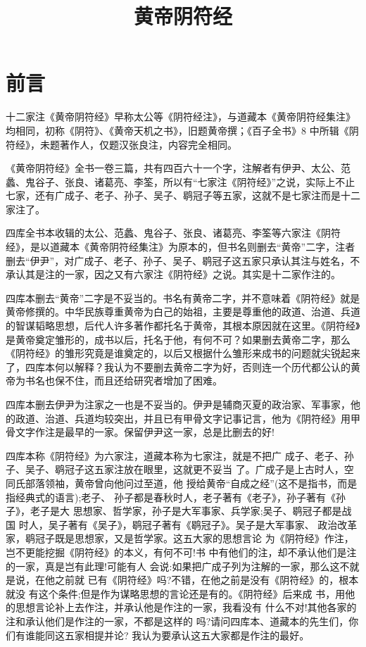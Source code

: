 \documentclass[12pt,UTF8]{ctexbook}
\title{\heiti\zihao{0} 黄帝阴符经}
\author{}
\date{}
\begin{document}
\maketitle
\tableofcontents

\frontmatter
\chapter{前言}

十二家注《黄帝阴符经》早称太公等《阴符经注》，与道藏本《黄帝阴符经集注》均相同，初称《阴符》、《黄帝天机之书》，旧题黄帝撰；《百子全书》8 中所辑《阴符经》，未题著作人，仅题汉张良注，内容完全相同。

《黄帝阴符经》全书一卷三篇，共有四百六十一个字，注解者有伊尹、太公、范蠡、鬼谷子、张良、诸葛亮、李筌，所以有“七家注《阴符经》”之说，实际上不止七家，还有广成子、老子、孙子、吴子、鹖冠子等五家，这就不是七家注而是十二家注了。

四库全书本收辑的太公、范蠡、鬼谷子、张良、诸葛亮、李筌等六家注《阴符经》，是以道藏本《黄帝阴符经集注》为原本的，但书名则删去“黄帝”二字，注者删去“伊尹”，对广成子、老子、孙子、吴子、鹖冠子这五家只承认其注与姓名，不承认其是注的一家，因之又有六家注《阴符经》之说。其实是十二家作注的。

四库本删去“黄帝”二字是不妥当的。书名有黄帝二字，并不意味着《阴符经》就是黄帝修撰的。中华民族尊重黄帝为白己的始祖，主要是尊重他的政道、治道、兵道的智谋韬略思想，后代人许多著作都托名于黄帝，其根本原因就在这里。《阴符经》是黄帝奠定雏形的，成书以后，托名于他，有何不可？如果删去黄帝二字，那么《阴符经》的雏形究竟是谁奠定的，以后又根据什么雏形来成书的问题就尖锐起来了，四库本何以解释？我认为不要删去黄帝二字为好，否则连一个历代都公认的黄帝为书名也保不住，而且还给研究者增加了困难。

四库本删去伊尹为注家之一也是不妥当的。伊尹是辅商灭夏的政治家、军事家，他的政道、治道、兵道均较突出，并且已有甲骨文字记事记言，他为《阴符经》用甲骨文字作注是最早的一家。保留伊尹这一家，总是比删去的好!

四库本称《阴符经》为六家注，道藏本称为七家注，就是不把广
成子、老子、孙子、吴子、鹖冠子这五家注放在眼里，这就更不妥当
了。广成子是上古时人，空同氏部落领袖，黄帝曾向他问过至道，他
授给黄帝“自成之经”(这不是指书，而是指经典式的语言);老子、
孙子都是春秋时人，老子著有《老子》，孙子著有《孙子》，老子是大
思想家、哲学家，孙子是大军事家、兵学家;吴子、鹖冠子都是战国
时人，吴子著有《吴子》，鹖冠子著有《鹖冠子》。吴子是大军事家、
政治改革家，鹖冠子既是思想家，又是哲学家。这五大家的思想言论
为《阴符经》作注，岂不更能挖掘《阴符经》的本义，有何不可!书
中有他们的注，却不承认他们是注的一家，真是岂有此理!可能有人
会说:如果把广成子列为注解的一家，那么这不就是说，在他之前就
已有《阴符经》吗?不错，在他之前是没有《阴符经》的，根本就没
有这个条件;但是作为谋略思想的言论还是有的。《阴符经》后来成
书，用他的思想言论补上去作注，并承认他是作注的一家，我看没有
什么不对!其他各家的注和承认他们是作注的一家，不都是这样的
吗?请问四库本、道藏本的先生们，你们有谁能同这五家相提并论?
我认为要承认这五大家都是作注的最好。
\end{document}
